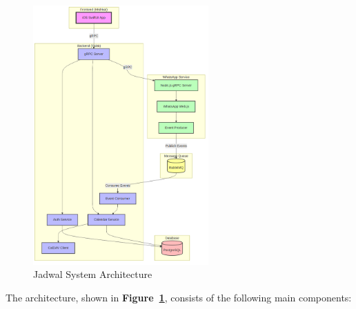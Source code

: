 \documentclass[12pt,a4paper,twoside]{report}
\begin{document}
\begin{figure}[!h]
    \centering
    \includegraphics[width=0.6\textwidth]{images/architecture.png}
    \caption{Jadwal System Architecture}
    \label{fig:architecture}
\end{figure}

The architecture, shown in \textbf{Figure~\ref{fig:architecture}}, consists of the following main components:
\end{document}
